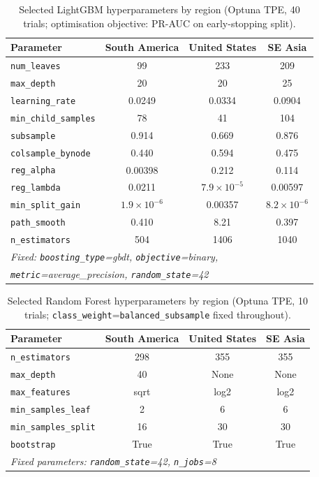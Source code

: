 \documentclass[12pt]{article}
\theoremstyle{break}
\begin{document}
\begin{appendices}
\begin{table}[!htbp]
\centering
\caption{Selected LightGBM hyperparameters by region (Optuna TPE, 40 trials; optimisation
objective: PR-AUC on early-stopping split).}
\label{tab:hparams_lgbm}
\small
\begin{tabular}{lccc}
\toprule
\textbf{Parameter} & \textbf{South America} & \textbf{United States} & \textbf{SE Asia} \\
\midrule
\texttt{num\_leaves}        & 99    & 233   & 209   \\
\texttt{max\_depth}         & 20    & 20    & 25    \\
\texttt{learning\_rate}     & 0.0249 & 0.0334 & 0.0904 \\
\texttt{min\_child\_samples}& 78    & 41    & 104   \\
\texttt{subsample}          & 0.914 & 0.669 & 0.876 \\
\texttt{colsample\_bynode}  & 0.440 & 0.594 & 0.475 \\
\texttt{reg\_alpha}         & 0.00398 & 0.212 & 0.114 \\
\texttt{reg\_lambda}        & 0.0211 & $7.9\times10^{-5}$ & 0.00597 \\
\texttt{min\_split\_gain}   & $1.9\times10^{-6}$ & 0.00357 & $8.2\times10^{-6}$ \\
\texttt{path\_smooth}       & 0.410 & 8.21  & 0.397 \\
\texttt{n\_estimators}      & 504   & 1406  & 1040  \\
\midrule
\multicolumn{4}{l}{\textit{Fixed: \texttt{boosting\_type}=gbdt, \texttt{objective}=binary,}} \\
\multicolumn{4}{l}{\textit{\texttt{metric}=average\_precision, \texttt{random\_state}=42}} \\
\bottomrule
\end{tabular}
\end{table}

\begin{table}[!htbp]
\centering
\caption{Selected Random Forest hyperparameters by region (Optuna TPE, 10 trials;
\texttt{class\_weight}=\texttt{balanced\_subsample} fixed throughout).}
\label{tab:hparams_rf}
\footnotesize
\begin{tabular}{lccc}
\toprule
\textbf{Parameter} & \textbf{South America} & \textbf{United States} & \textbf{SE Asia} \\
\midrule
\texttt{n\_estimators}      & 298  & 355  & 355   \\
\texttt{max\_depth}         & 40   & None & None  \\
\texttt{max\_features}      & sqrt & log2 & log2  \\
\texttt{min\_samples\_leaf} & 2    & 6    & 6     \\
\texttt{min\_samples\_split}& 16   & 30   & 30    \\
\texttt{bootstrap}          & True & True & True  \\
\midrule
\multicolumn{4}{l}{\textit{Fixed parameters: \texttt{random\_state}=42, \texttt{n\_jobs}=8}} \\
\bottomrule
\end{tabular}
\end{table}


\end{appendices}
\end{document}
